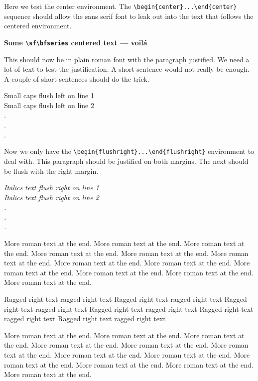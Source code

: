 \documentclass{article}
\begin{document}
Here we test the center environment.  The \verb#\begin{center}...\end{center}#
sequence should allow the sans serif font to leak out into the text that follows
the centered environment. 
\begin{center}
\sf\bfseries Some \verb#\sf\bfseries# centered text --- voil\'a
\end{center}
This should now be in plain roman font with the paragraph justified.
We need a lot of text to test the justification.  A short sentence would
not really be enough.  A couple of short sentences should do the trick.
\begin{flushleft}
\sc Small caps flush left on line 1 \\
Small caps flush left on line 2 \\
.\\
.\\
.\\
\end{flushleft}
Now we only have the \verb#\begin{flushright}...\end{flushright}# environment
to deal with.  This paragraph should be justified on both margins. The next should
be flush with the right margin.

\begin{flushright}
\itshape 
Italics text flush right on line 1 \\
Italics text flush right on line 2 \\
.\\
.\\
.\\
\end{flushright}

More roman text at the end. More roman text at the end. More roman text at the end. 
More roman text at the end. More roman text at the end. More roman text at the end.
More roman text at the end. More roman text at the end. More roman text at the end.
More roman text at the end. More roman text at the end. More roman text at the end.

{\raggedright
Ragged right text ragged right text Ragged right text ragged right text
Ragged right text ragged right text Ragged right text ragged right text
Ragged right text ragged right text Ragged right text ragged right text\par}


More roman text at the end. More roman text at the end. More roman text at the end. 
More roman text at the end. More roman text at the end. More roman text at the end.
More roman text at the end. More roman text at the end. More roman text at the end.
More roman text at the end. More roman text at the end. More roman text at the end.
\end{document}
